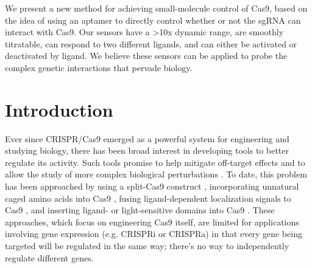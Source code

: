 \documentclass[10pt,oneside]{article}
\begin{document}


We present a new method for achieving small-molecule control of Cas9, based on the idea of using an aptamer to directly control whether or not the sgRNA can interact with Cas9.  Our sensors have a >10x dynamic range, are smoothly titratable, can respond to two different ligands, and can either be activated or deactivated by ligand.  We believe these sensors can be applied to probe the complex genetic interactions that pervade biology.

\section{Introduction}


Ever since CRISPR/Cas9 emerged as a powerful system for engineering and studying biology, there has been broad interest in developing tools to better regulate its activity.  Such tools promise to help mitigate off-target effects and to allow the study of more complex biological perturbations \autocite{richter2017}.  To date, this problem has been approached by using a split-Cas9 construct \autocite{zetsche2015,nguyen2016,nihongaki2015}, incorporating unnatural caged amino acids into Cas9 \autocite{hemphill2015,luo2016}, fusing ligand-dependent localization signals to Cas9 \autocite{liuramli2016}, and inserting ligand- or light-sensitive domains into Cas9 \autocite{oakes2016,richter2016}.  These approaches, which focus on engineering Cas9 itself, are limited for applications involving gene expression (e.g. CRISPRi or CRISPRa) in that every gene being targeted will be regulated in the same way; there's no way to independently regulate different genes.

\end{document}
